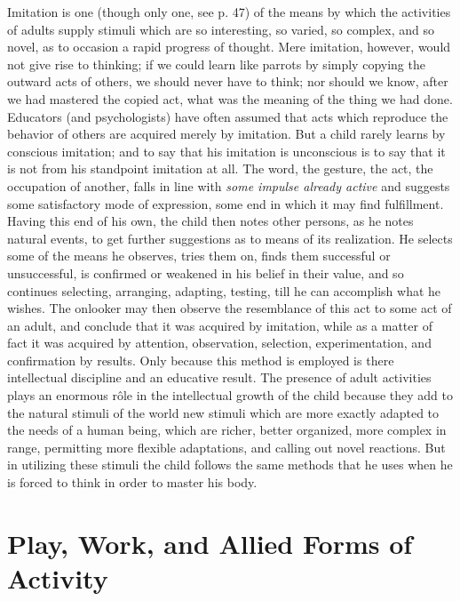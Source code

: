 \documentclass[letterpaper]{book}
\begin{document}
Imitation is one (though only one, see p. 47) of the means by which the
activities of adults supply stimuli which are so interesting, so varied,
so complex, and so novel, as to occasion a rapid progress of thought.
Mere imitation, however, would not give rise to thinking; if we could
learn like parrots by simply copying the outward acts of others, we
should never have to think; nor should we know, after we had mastered
the copied act, what was the meaning of the thing we had done. Educators
(and psychologists) have often assumed that acts which reproduce the
behavior of others are acquired merely by imitation. But a child rarely
learns by conscious imitation; and to say that his imitation is
unconscious is to say that it is not from his standpoint imitation at
all. The word, the gesture, the act, the occupation of another, falls in
line with \emph{some impulse already active} and suggests some
satisfactory mode of expression, some end in which it may find
fulfillment. Having this end of his own, the child then notes other
persons, as he notes natural events, to get further suggestions as to
means of its realization. He selects some of the means he observes,
tries them on, finds them successful or unsuccessful, is confirmed or
weakened in his belief in their value, and so continues selecting,
arranging, adapting, testing, till he can accomplish what he wishes. The
onlooker may then observe the resemblance of this act to some act of an
adult, and conclude that it was acquired by imitation, while as a matter
of fact it was acquired by attention, observation, selection,
experimentation, and confirmation by results.
Only
because this method is employed is there intellectual discipline and an
educative result. The presence of adult activities plays an enormous
rôle in the intellectual growth of the child because they add to the
natural stimuli of the world new stimuli which are more exactly adapted
to the needs of a human being, which are richer, better organized, more
complex in range, permitting more flexible adaptations, and calling out
novel reactions. But in utilizing these stimuli the child follows the
same methods that he uses when he is forced to think in order to master
his body.

\section{Play, Work, and Allied Forms of Activity}

\end{document}
